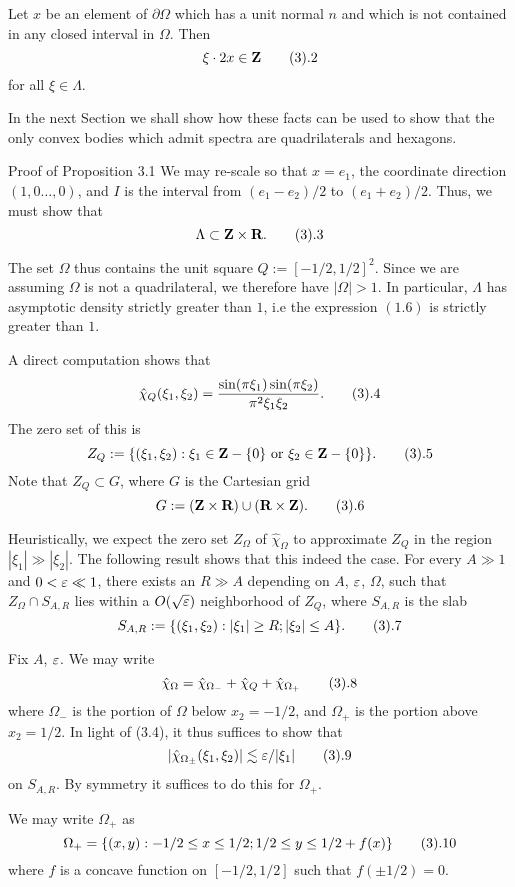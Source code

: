   Let $x$ be an element of $\partial
\Omega$ which has a unit normal $n$ and which is not contained
in any closed interval in $\Omega$. Then
$$ \xi \cdot 2x \in \Z \tag3.2$$ for all $\xi \in \Lambda$.
\endproclaim

In the next Section we shall show how these facts can be used to
show that the only convex bodies which admit spectra are
quadrilaterals and hexagons.

\subhead Proof of Proposition 3.1 \endsubhead We may re-scale so
that $x = e_1$, the coordinate direction $(1, 0 \dots, 0)$, and
$I$ is the interval from $(e_1 - e_2)/2$ to $(e_1 + e_2)/2$.
Thus, we must show that
$$ \Lambda \subset \Z \times \R. \tag 3.3$$

The set $\Omega$ thus contains the unit square $Q :=
[-1/2,1/2]^2$. Since we are assuming $\Omega$ is not a
quadrilateral, we therefore have $|\Omega| > 1$. In particular,
$\Lambda$ has asymptotic density strictly greater than $1$, i.e
the expression $(1.6)$ is strictly greater than $1$.

A direct computation shows that
$$ \hat \chi_Q(\xi_1, \xi_2) = \frac{ \sin(\pi \xi_1)
\sin(\pi \xi_2) }{\pi^2 \xi_1 \xi_2}. \tag 3.4$$
The zero set of this is
$$ Z_Q := \{ (\xi_1, \xi_2): \xi_1 \in \Z - \{0\} \hbox{ or }
\xi_2 \in \Z -
\{0\} \}. \tag3.5$$
Note that $Z_Q \subset G$, where $G$ is the Cartesian grid
$$ G := (\Z \times \R) \cup (\R \times \Z). \tag3.6$$

Heuristically, we expect the zero set $Z_\Omega$ of $\hat
\chi_{\Omega}$ to approximate $Z_Q$ in the region $|\xi_1| \gg
|\xi_2|$. The following result shows that this indeed the case.
 For every $A \gg 1$ and $0 < \varepsilon \ll 1$,
there exists an $R \gg A$ depending on $A$, $\varepsilon$, $\Omega$,
such that $Z_\Omega \cap S_{A,R}$ lies within a $O(\sqrt{\varepsilon})$
neighborhood of $Z_Q$, where $S_{A,R}$ is the slab
$$ S_{A,R} := \{ (\xi_1, \xi_2): |\xi_1| \geq R; |\xi_2| \leq A \}. \tag3.7$$
\endproclaim

Fix $A$, $\varepsilon$. We may write
$$ \hat \chi_\Omega = \hat \chi_{\Omega_-} + \hat \chi_Q + \hat \chi_{\Omega_+} \tag3.8$$
where $\Omega_-$ is the portion of $\Omega$ below $x_2 = -1/2$, and $\Omega_+$
is the portion above $x_2 = 1/2$.  In light of (3.4), it thus suffices to show that
$$ |\hat \chi_{\Omega_\pm}(\xi_1, \xi_2)| \lesssim \eps / |\xi_1| \tag 3.9$$
on $S_{A,R}$. By symmetry it suffices to do this for $\Omega_+$.

We may write $\Omega_+$ as
$$ \Omega_+ = \{ (x,y): -1/2 \leq x \leq 1/2; 1/2 \leq y \leq 1/2 + f(x) \} \tag3.10$$
where $f$ is a concave function on $[-1/2,1/2]$ such that $f(\pm 1/2) = 0$.

